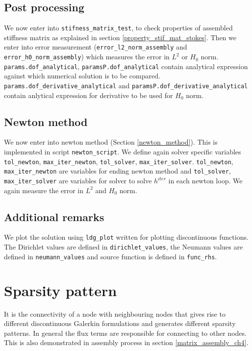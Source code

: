 \documentclass[a4paper]{book}
\begin{document}
\subsection{Post processing}

We now enter into \verb|stifness_matrix_test|, to check properties of assembled stiffness matrix as explained in section \ref{property_stif_mat_stokes}. Then we enter into error measurement (\verb|error_l2_norm_assembly| and \verb|error_h0_norm_assembly|) which measures the error in $L^2$ or $H_0$ norm. \verb|params.dof_analytical|, \linebreak \verb|paramsP.dof_analytical| contain analytical expression against which numerical solution is to be compared. \verb|params.dof_derivative_analytical| and \verb|paramsP.dof_derivative_analytical| contain anlytical expression for derivative to be used for $H_0$ norm.\\

\subsection{Newton method}

We now enter into newton method (Section \ref{newton_method}). This is implemented in script \verb|newton_script|. We define again solver specific variables \verb|tol_newton|, \verb|max_iter_newton|, \verb|tol_solver|, \verb|max_iter_solver|. \verb|tol_newton|, \linebreak \verb|max_iter_newton| are variables for ending newton method and \verb|tol_solver|, \verb|max_iter_solver| are variables for solver to solve $h^{iter}$ in each newton loop. We again measure the error in $L^2$ and $H_0$ norm.\\

\subsection{Additional remarks}

We plot the solution using  \verb|ldg_plot| written for plotting discontinuous functions. The Dirichlet values are defined in \verb|dirichlet_values|, the Neumann values are defined in \verb|neumann_values| and source function is defined in \verb|func_rhs|. 

\section{Sparsity pattern}

It is the connectivity of a node with neighbouring nodes that gives rise to different discontinuous Galerkin formulations and generates different sparsity patterns. In general the flux terms are responsible for connecting to other nodes. This is also demonstrated in assembly process in section \ref{matrix_assembly_ch4}. 
\end{document}
